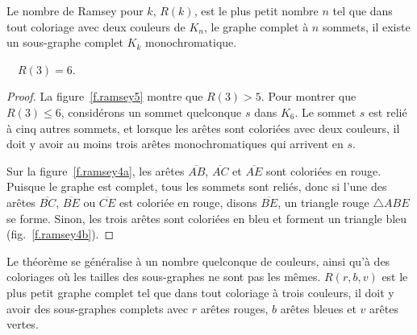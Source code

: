 \vspace{0.4cm}





\begin{definition}
 Le nombre de Ramsey pour $k$,  $R(k)$, est le plus petit nombre $n$ tel que dans tout coloriage avec deux couleurs de $K_{n}$, le graphe complet à $n$ sommets,  il existe un sous-graphe complet $K_k$ monochromatique.
\end{definition}


\begin{theorem}[Ramsey]
$\quad R(3)=6$.\label{thm.ramsey}
\end{theorem}

\begin{proof} 
La figure~\ref{f.ramsey5} montre que $R(3)>5$. Pour montrer que $R(3)\leq 6$, considérons un sommet quelconque $s$ dans $K_6$. Le sommet $s$ est relié à cinq autres sommets, et lorsque les arêtes sont coloriées avec deux couleurs, il doit y avoir au moins trois arêtes monochromatiques qui arrivent en $s$. 

Sur la figure~\ref{f.ramsey4a}, les arêtes $\overline{AB}$, $\overline{AC}$ et $\overline{AE}$ sont coloriées en rouge. Puisque le graphe est complet, tous les sommets sont reliés, donc si l'une des arêtes $\overline{BC}$, $\overline{BE}$ ou $\overline{CE}$ est coloriée en rouge, disons $\overline{BE}$, un triangle rouge $\triangle ABE$ se forme. Sinon, les trois arêtes sont coloriées en bleu et forment un triangle bleu (fig.~\ref{f.ramsey4b}).
\end{proof}

Le théorème se généralise à un nombre quelconque de couleurs, ainsi qu'à des coloriages où les tailles des sous-graphes ne sont pas les mêmes. $R(r,b,v)$ est le plus petit graphe complet tel que dans tout coloriage à trois couleurs, il doit y avoir des sous-graphes complets avec $r$ arêtes rouges, $b$ arêtes bleues et $v$ arêtes vertes.

\vspace{0.4cm}


